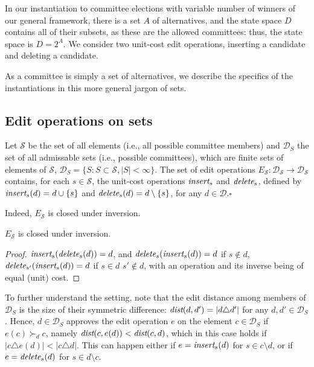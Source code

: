 \documentclass[sigconf]{aamas}  %
\newcommand{\qqed}{\hfill$\square$}
\newcommand{\calD}{\mathcal{D}}
\newcommand{\calS}{\mathcal{S}}
\newcommand{\iinsert}[1]{\emph{insert}_{#1}}
\newcommand{\ddelete}[1]{\emph{delete}_{#1}}
\newcommand{\prefers}[1]{\succ_{#1}}
\newcommand{\dist}{\emph{dist}}
\begin{document}
In our instantiation to committee elections with variable number of winners of our general framework, there is a set $A$ of alternatives, and the state space $D$ contains all of their subsets, as these are the allowed committees:
  thus, the state space is $D = 2^A$.
We consider two unit-cost edit operations, inserting a candidate and deleting a candidate.

As a committee is simply a set of alternatives, we describe the specifics of the instantiations in this more general jargon of sets.


\subsection{Edit operations on sets}

\begin{definition}
Let $\calS$ be the set of all elements (i.e., all possible committee members) and $\calD_S$ the set of all admissable sets (i.e., possible committees), which are finite sets of elements of $\calS$,   $\calD_S = \{S: S \subset \calS, |S| < \infty\}$. The set of edit operations $E_\calS: \calD_\calS \rightarrow \calD_\calS$ contains, for each $s \in \calS$, the unit-cost operations $\iinsert{s}$ and $\ddelete{s}$, defined by
$\iinsert{s}(d) = d \cup \{s\}$ and $\ddelete{s}(d) = d \setminus \{s\}$, for any $d \in \calD$.\qqed
\end{definition}

Indeed, $E_\calS$ is closed under inversion.

\begin{lemma}
  $E_\calS$ is closed under inversion.
\end{lemma}

\begin{proof}
%
$\iinsert{s}(\ddelete{s}(d)) = d$, and $\ddelete{s}(\iinsert{s}(d)) = d$ if $s \notin d$, $\ddelete{{s'}}(\iinsert{s}(d)) = d$ if $s \in d$ $s' \notin d$, with an operation and its inverse being of equal (unit) cost.  
%
\end{proof}

To further understand the setting, note that the edit distance among members of $\calD_S$ is the size of their symmetric difference:  $\dist(d,d') = |d \triangle d'|$ for any $d, d' \in \calD_S$. Hence,
$d \in \calD_S$ approves the edit operation $e$ on the element $c \in \calD_S$ if $e(c) \prefers{d} c$, namely  $\dist(c, e(d)) < \dist(c, d)$, which in this case holds if $|c \triangle e(d)| < |c \triangle d|$.  This can happen either if $e = \iinsert{s}(d)$ for $s  \in c \setminus d$, or if $e = \ddelete{s}(d)$ for $s  \in d \setminus c$. 
\end{document}
